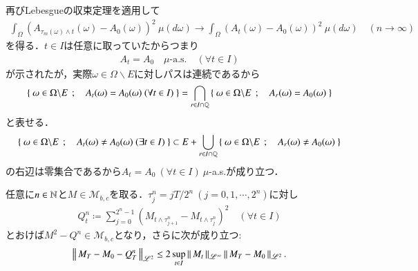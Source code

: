 \begin{prf}
		再びLebesgueの収束定理を適用して
		\begin{align}
			\int_\Omega \left( A_{\tau_m(\omega) \wedge t}(\omega) - A_{0}(\omega) \right)^2\ \mu(d\omega)
			\longrightarrow \int_\Omega \left( A_t(\omega) - A_{0}(\omega) \right)^2\ \mu(d\omega) \quad (n \longrightarrow \infty)
		\end{align}
		を得る．$t \in I$は任意に取っていたからつまり
		\begin{align}
			A_t = A_0 \quad \mbox{$\mu$-a.s.} \quad (\forall t \in I)
		\end{align}
		が示されたが，実際$\omega \in \Omega \backslash E$に対しパスは連続であるから
		\begin{align}
			\left\{\ \omega \in \Omega \backslash E\ \, ; \quad A_t(\omega) = A_0(\omega)\ (\forall t \in I)\ \right\}
			= \bigcap_{r \in I \cap \mathbb{Q}} \left\{\ \omega \in \Omega \backslash E\ \, ; \quad A_r(\omega) = A_0(\omega)\ \right\}
		\end{align}
		と表せる．
		\begin{align}
			\left\{\ \omega \in \Omega \backslash E\ \, ; \quad A_t(\omega) \neq A_0(\omega)\ (\exists t \in I)\ \right\}
			\subset E + \bigcup_{r \in I \cap \mathbb{Q}} \left\{\ \omega \in \Omega \backslash E\ \, ; \quad A_r(\omega) \neq A_0(\omega)\ \right\}
		\end{align}
		の右辺は零集合であるから$A_t = A_0\ (\forall t \in I)\ $$\mu$-a.s.が成り立つ．
		\QED
	\end{prf}
	
	\begin{itembox}[l]{}
		\begin{lem}[二次変分補題]
			任意に$n \in \mathbb{N}$と$M \in \mathcal{M}_{b,c}$を取る．$\tau_j^n = jT/2^n\ (j=0,1,\cdots,2^n)$に対し
			\begin{align}
				Q_t^n \coloneqq \sum_{j=0}^{2^n-1} \left( M_{t \wedge \tau_{j+1}^n} - M_{t \wedge \tau_j^n} \right)^2 \quad (\forall t \in I)
			\end{align}
			とおけば$M^2 - Q^n \in \mathcal{M}_{b,c}$となり，さらに次が成り立つ:
			\begin{align}
				\left\|\, M_T - M_0 - Q_T^n\, \right\|_{\mathscr{L}^2} \leq 2 \operatorname*{sup}_{t \in I} \left\|\, M_t\, \right\|_{\mathscr{L}^\infty} \left\|\, M_T - M_0\, \right\|_{\mathscr{L}^2}.
			\end{align}
			\label{lem:quadratic_variation}
		\end{lem}
	\end{itembox}
	
